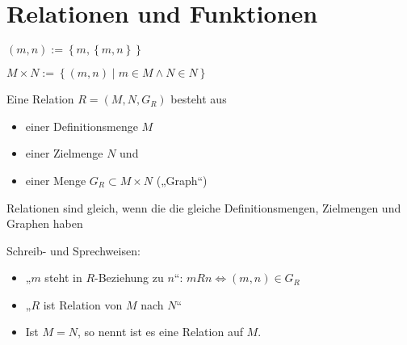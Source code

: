 \section{Relationen und Funktionen}
\begin{definition}
  $(m, n) := \left\{ m, \left\{ m, n \right\} \right\}$
\end{definition}
\begin{definition}
  $M \times N := \left\{ (m, n) \middle| m \in M \wedge N \in N \right\}$\index[sym]{$\times$}
\end{definition}
\begin{definition}
  Eine Relation $R = (M, N, G_R)$ besteht aus
  \begin{itemize}
  \item einer Definitionsmenge $M$
  \item einer Zielmenge $N$ und
  \item einer Menge $G_R \subset M \times N$ („Graph“)
  \end{itemize}

  Relationen sind gleich, wenn die die gleiche Definitionsmengen, Zielmengen und Graphen haben
  
  Schreib- und Sprechweisen:
  \begin{itemize}
  \item „$m$ steht in $R$-Beziehung zu $n$“: $mRn \iff (m, n) \in G_R$
  \item „$R$ ist Relation von $M$ nach $N$“
  \item Ist $M=N$, so nennt ist es eine Relation auf $M$.
  \end{itemize}
\end{definition}

